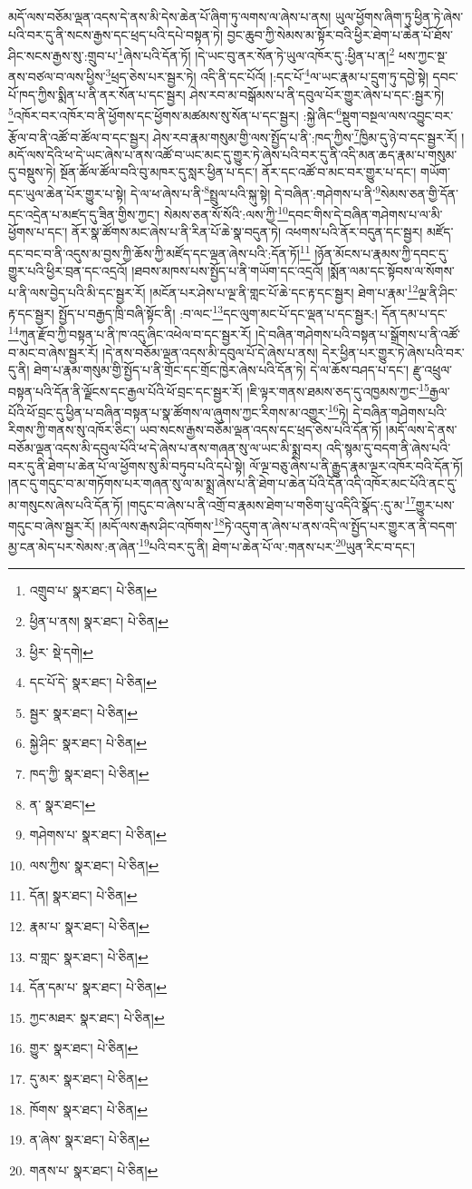 མདོ་ལས་བཅོམ་ལྡན་འདས་དེ་ནས་མི་དེས་ཆེན་པོ་ཞིག་ཏུ་ལགས་ལ་ཞེས་པ་ནས། ཡུལ་ཕྱོགས་ཞིག་ཏུ་ཕྱིན་ཏེ་ཞེས་པའི་བར་དུ་ནི་སངས་རྒྱས་དང་ཕྲད་པའི་དཔེ་བསྟན་ཏེ། བྱང་ཆུབ་ཀྱི་སེམས་མ་སྟོར་བའི་ཕྱིར་ཐེག་པ་ཆེན་པོ་ཐོས་ཤིང་སངས་རྒྱས་སུ་:གྲུབ་པ་\footnote{འགྲུབ་པ་  སྣར་ཐང་།  པེ་ཅིན། }ཞེས་པའི་དོན་ཏོ། །དེ་ཡང་བུ་ནར་སོན་ཏེ་ཡུལ་འཁོར་དུ་:ཕྱིན་པ་ན།\footnote{ཕྱིན་པ་ནས།  སྣར་ཐང་།  པེ་ཅིན། } ཕས་ཀྱང་སྔ་ནས་བཙལ་བ་ལས་ཕྱིས་\footnote{ཕྱིར་  སྡེ་དགེ། }ཕྲད་ཅེས་པར་སྦྱར་ཏེ། འདི་ནི་དང་པོའོ། །:དང་པོ་\footnote{དང་པོ་དེ་  སྣར་ཐང་།  པེ་ཅིན། }ལ་ཡང་རྣམ་པ་དྲུག་ཏུ་དབྱེ་སྟེ། དབང་པོ་ཁད་ཀྱིས་སྨིན་པ་ནི་ནར་སོན་པ་དང་སྦྱར། ཤེས་རབ་མ་བསྒོམས་པ་ནི་དབུལ་པོར་གྱུར་ཞེས་པ་དང་:སྦྱར་ཏེ། \footnote{སྦྱར་  སྣར་ཐང་།  པེ་ཅིན། }འཁོར་བར་འཁོར་བ་ནི་ཕྱོགས་དང་ཕྱོགས་མཚམས་སུ་སོན་པ་དང་སྦྱར། :སྐྱེ་ཞིང་\footnote{སྐྱེ་ཤིང་  སྣར་ཐང་།  པེ་ཅིན། }སྡུག་བསྔལ་ལས་འབྱུང་བར་རྩོལ་བ་ནི་འཚོ་བ་ཚོལ་བ་དང་སྦྱར། ཤེས་རབ་རྣམ་གསུམ་གྱི་ལས་སྤྱོད་པ་ནི་:ཁད་ཀྱིས་\footnote{ཁད་ཀྱི་  སྣར་ཐང་།  པེ་ཅིན། }ཁྱིམ་དུ་ཉེ་བ་དང་སྦྱར་རོ། །མདོ་ལས་དེའི་ཕ་དེ་ཡང་ཞེས་པ་ནས་འཚོ་བ་ཡང་མང་དུ་གྱུར་ཏེ་ཞེས་པའི་བར་དུ་ནི་འདི་མན་ཆད་རྣམ་པ་གསུམ་དུ་བསྡུས་ཏེ། སྔོན་ཚོལ་ཚོལ་བའི་བུ་མཁར་དུ་སླར་ཕྱིན་པ་དང་། ནོར་དང་འཚོ་བ་མང་བར་གྱུར་པ་དང་། གཡོག་དང་ཡུལ་ཆེན་པོར་གྱུར་པ་སྟེ། དེ་ལ་ཕ་ཞེས་པ་ནི་\footnote{ན་  སྣར་ཐང་། }སྤྲུལ་པའི་སྐུ་སྟེ། དེ་བཞིན་:གཤེགས་པ་ནི་\footnote{གཤེགས་པ་  སྣར་ཐང་།  པེ་ཅིན། }སེམས་ཅན་གྱི་དོན་དང་འདྲེན་པ་མཛད་དུ་ཟིན་གྱིས་ཀྱང་། སེམས་ཅན་སོ་སོའི་:ལས་ཀྱི་\footnote{ལས་ཀྱིས་  སྣར་ཐང་།  པེ་ཅིན། }དབང་གིས་དེ་བཞིན་གཤེགས་པ་ལ་མི་ཕྱོགས་པ་དང་། ནོར་སྣ་ཚོགས་མང་ཞེས་པ་ནི་རིན་པོ་ཆེ་སྣ་བདུན་ཏེ། འཕགས་པའི་ནོར་བདུན་དང་སྦྱར། མཛོད་དང་བང་བ་ནི་འདུས་མ་བྱས་ཀྱི་ཆོས་ཀྱི་མཛོད་དང་ལྡན་ཞེས་པའི་:དོན་ཏོ།\footnote{དོན།  སྣར་ཐང་།  པེ་ཅིན། } །ཉོན་མོངས་པ་རྣམས་ཀྱི་དབང་དུ་གྱུར་པའི་ཕྱིར་བྲན་དང་འདྲའོ། །ཐབས་མཁས་པས་སྤྱོད་པ་ནི་གཡོག་དང་འདྲའོ། །སྨོན་ལམ་དང་སྟོབས་ལ་སོགས་པ་ནི་ལས་བྱེད་པའི་མི་དང་སྦྱར་རོ། །མངོན་པར་ཤེས་པ་ལྔ་ནི་གླང་པོ་ཆེ་དང་རྟ་དང་སྦྱར། ཐེག་པ་རྣམ་\footnote{རྣམ་པ་  སྣར་ཐང་།  པེ་ཅིན། }ལྔ་ནི་ཤིང་རྟ་དང་སྦྱར། སྤྱོད་པ་བརྒྱད་ཁྲི་བཞི་སྟོང་ནི། :བ་ལང་\footnote{བ་གླང་  སྣར་ཐང་།  པེ་ཅིན། }དང་ལུག་མང་པོ་དང་ལྡན་པ་དང་སྦྱར:། དོན་དམ་པ་དང་\footnote{དོན་དམ་པ་  སྣར་ཐང་།  པེ་ཅིན། }ཀུན་རྫོབ་ཀྱི་བསྟན་པ་ནི་ཁ་འདུ་ཞིང་འཕེལ་བ་དང་སྦྱར་རོ། །དེ་བཞིན་གཤེགས་པའི་བསྟན་པ་སྒྲོགས་པ་ནི་འཚོ་བ་མང་བ་ཞེས་སྦྱར་རོ། །དེ་ནས་བཅོམ་ལྡན་འདས་མི་དབུལ་པོ་དེ་ཞེས་པ་ནས། དེར་ཕྱིན་པར་གྱུར་ཏེ་ཞེས་པའི་བར་དུ་ནི། ཐེག་པ་རྣམ་གསུམ་གྱི་སྤྱོད་པ་ནི་གྲོང་དང་གྲོང་ཁྱེར་ཞེས་པའི་དོན་ཏེ། དེ་ལ་ཆོས་བཤད་པ་དང་། རྫུ་འཕྲུལ་བསྟན་པའི་དོན་ནི་ལྗོངས་དང་རྒྱལ་པོའི་ཕོ་བྲང་དང་སྦྱར་རོ། །ཇི་ལྟར་གནས་ཐམས་ཅད་དུ་འཁྱམས་ཀྱང་\footnote{ཀྱང་མཐར་  སྣར་ཐང་།  པེ་ཅིན། }རྒྱལ་པོའི་ཕོ་བྲང་དུ་ཕྱིན་པ་བཞིན་བསྟན་པ་སྣ་ཚོགས་ལ་ཞུགས་ཀྱང་རིགས་མ་འགྱུར་\footnote{གྱུར་  སྣར་ཐང་།  པེ་ཅིན། }ཏེ། དེ་བཞིན་གཤེགས་པའི་རིགས་ཀྱི་གནས་སུ་འཁོར་ཅིང་། ཡབ་སངས་རྒྱས་བཅོམ་ལྡན་འདས་དང་ཕྲད་ཅེས་པའི་དོན་ཏོ། །མདོ་ལས་དེ་ནས་བཅོམ་ལྡན་འདས་མི་དབུལ་པོའི་ཕ་དེ་ཞེས་པ་ནས་གཞན་སུ་ལ་ཡང་མི་སྨྲ་བར། འདི་སྙམ་དུ་བདག་ནི་ཞེས་པའི་བར་དུ་ནི་ཐེག་པ་ཆེན་པོ་ལ་ཕྱོགས་སུ་མི་བཏུབ་པའི་དཔེ་སྟེ། ལོ་ལྔ་བཅུ་ཞེས་པ་ནི་རྒྱུད་རྣམ་ལྔར་འཁོར་བའི་དོན་ཏོ། །ནང་དུ་གདུང་བ་མ་གཏོགས་པར་གཞན་སུ་ལ་མ་སྨྲ་ཞེས་པ་ནི་ཐེག་པ་ཆེན་པོའི་དོན་འདི་འཁོར་མང་པོའི་ནང་དུ་མ་གསུངས་ཞེས་པའི་དོན་ཏོ། །གདུང་བ་ཞེས་པ་ནི་འགྲོ་བ་རྣམས་ཐེག་པ་གཅིག་པུ་འདིའི་སྣོད་:དུ་མ་\footnote{དུ་མར་  སྣར་ཐང་།  པེ་ཅིན། }གྱུར་པས་གདུང་བ་ཞེས་སྦྱར་རོ། །མདོ་ལས་རྒས་ཤིང་འཁོགས་\footnote{ཁོགས་  སྣར་ཐང་།  པེ་ཅིན། }ཏེ་འདུག་ན་ཞེས་པ་ནས་འདི་ལ་སྤྱོད་པར་གྱུར་ན་ནི་བདག་མྱ་ངན་མེད་པར་སེམས་:ན་ཞེན་\footnote{ན་ཞེས་  སྣར་ཐང་།  པེ་ཅིན། }པའི་བར་དུ་ནི། ཐེག་པ་ཆེན་པོ་ལ་:གནས་པར་\footnote{གནས་པ་  སྣར་ཐང་།  པེ་ཅིན། }ཡུན་རིང་བ་དང་། 